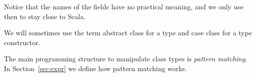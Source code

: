 Notice that the names of the fields have no practical meaning,
and we only use then to stay close to Scala.

We will sometimes use the term abstract class for a type
and case class for a type constructor.

The main programming structure to manipulate class types
is \emph{pattern matching}. In Section~\ref{sec:expr} we define how pattern matching works.



